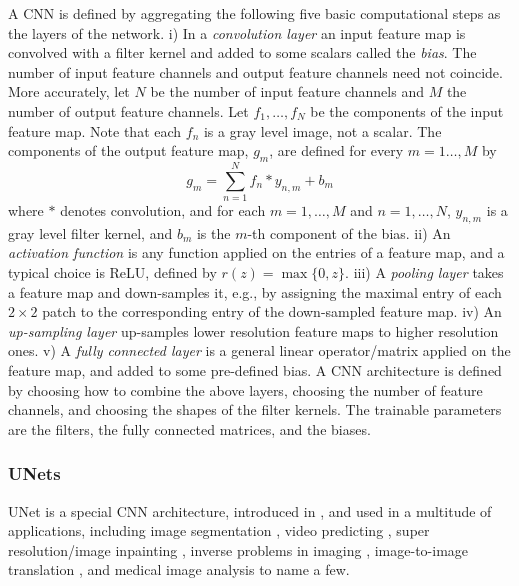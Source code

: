 \documentclass[10pt,a4paper]{article}
\begin{document}
A CNN is defined by aggregating the following five basic computational steps as the layers of the network. 
i) In a \emph{convolution layer} an input feature map is convolved with a filter kernel and added to some scalars called the \emph{bias}. The number of input feature channels and output feature channels need not coincide. More accurately, let $N$ be the number of input feature channels and $M$ the number of output feature channels. Let $f_1,\ldots,f_N$ be the components of the input feature map. Note that each $f_n$ is a gray level image, not a scalar. The components of the output feature map, $g_m$, are defined for every $m=1\ldots,M$ by
\begin{equation}
\label{eq:conv_layer}
    g_m = \sum_{n=1}^N f_n * y_{n,m} + b_m
\end{equation}
where $*$ denotes convolution,
and for each $m=1,\ldots,M$ and $n=1,\ldots,N$, $y_{n,m}$ is a gray level filter kernel, and $b_m$ is the $m$-th component of the bias.
ii) An \emph{activation function} is any function applied on the entries of a feature map, and a typical choice is ReLU, defined by $r(z)=\max\{0,z\}$. iii) A \emph{pooling layer} takes a feature map and down-samples it, e.g., by assigning the maximal entry of each $2 \times 2$ patch to the corresponding entry of the down-sampled feature map. iv) An  \emph{up-sampling layer} up-samples lower resolution feature maps to higher resolution ones. v) A \emph{fully connected layer} is a general linear operator/matrix applied on the feature map, and
added to some pre-defined bias. 
%
%
A CNN architecture is defined by choosing how to combine the above layers, choosing the number of feature channels, and choosing the shapes of the filter kernels. The trainable parameters are the filters, the fully connected matrices, and the biases. 


\subsubsection{UNets}

UNet is a special CNN architecture, introduced in \cite{UNet}, and used in a multitude of applications, including image segmentation \cite{FullyConv,Segnet,VNET,3DUnet}, video predicting \cite{UNetVideo}, super resolution/image inpainting \cite{UNetSupRes}, %
inverse problems in imaging \cite{InverseUNet}, image-to-image translation \cite{DualGAN}, and medical image analysis \cite{SurveyMedical} to name a few. 
\end{document}
